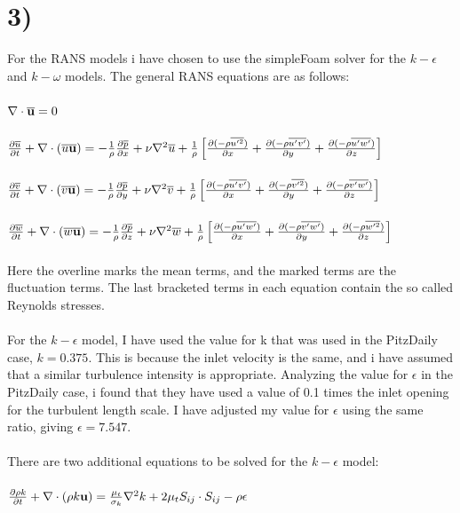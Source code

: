 \documentclass[a4paper,english,12pt,twoside]{article}
\begin{document}
\section*{3)}
For the RANS models i have chosen to use the simpleFoam solver for the $k-\epsilon$ and $k-\omega$ models. The general RANS equations are as follows:\\
\\
$\nabla\cdot\mathbf{\overline{u}} = 0$\\
\\
$\frac{\partial \overline{u}}{\partial t} + \nabla\cdot(\overline{u}\mathbf{\overline{u}}) = -\frac{1}{\rho}\frac{\partial \overline{p}}{\partial x} + \nu\nabla^2\overline{u} + \frac{1}{\rho}\left[\frac{\partial (-\rho\overline{u'^2})}{\partial x} + \frac{\partial (-\rho\overline{u'v'})}{\partial y} + \frac{\partial (-\rho\overline{u'w'})}{\partial z}\right]$
\\
\\
$\frac{\partial \overline{v}}{\partial t} + \nabla\cdot(\overline{v}\mathbf{\overline{u}}) = -\frac{1}{\rho}\frac{\partial \overline{p}}{\partial y} + \nu\nabla^2\overline{v} + \frac{1}{\rho}\left[\frac{\partial (-\rho\overline{u'v'})}{\partial x} + \frac{\partial (-\rho\overline{v'^2})}{\partial y} + \frac{\partial (-\rho\overline{v'w'})}{\partial z}\right]$
\\
\\
$\frac{\partial \overline{w}}{\partial t} + \nabla\cdot(\overline{w}\mathbf{\overline{u}}) = -\frac{1}{\rho}\frac{\partial \overline{p}}{\partial z} + \nu\nabla^2\overline{w} + \frac{1}{\rho}\left[\frac{\partial (-\rho\overline{u'w'})}{\partial x} + \frac{\partial (-\rho\overline{v'w'})}{\partial y} + \frac{\partial (-\rho\overline{w'^2})}{\partial z}\right]$
\\
\\
Here the overline marks the mean terms, and the marked terms are the fluctuation terms. The last bracketed terms in each equation contain the so called Reynolds stresses.\\
\\
For the $k-\epsilon$ model, I have used the value for k that was used in the PitzDaily case, $k = 0.375$. This is because the inlet velocity is the same, and i have assumed that a similar turbulence intensity is appropriate. Analyzing the value for $\epsilon$ in the PitzDaily case, i found that they have used a value of 0.1 times the inlet opening for the turbulent length scale. I have adjusted my value for $\epsilon$ using the same ratio, giving $\epsilon = 7.547$.\\
\\
There are two additional equations to be solved for the $k-\epsilon$ model:\\
\\
$\frac{\partial \rho k}{\partial t} + \nabla\cdot(\rho k \mathbf{u}) = \frac{\mu_t}{\sigma_k}\nabla^2k + 2\mu_t S_{ij}\cdot S_{ij} - \rho\epsilon$\\
\\
\end{document}
